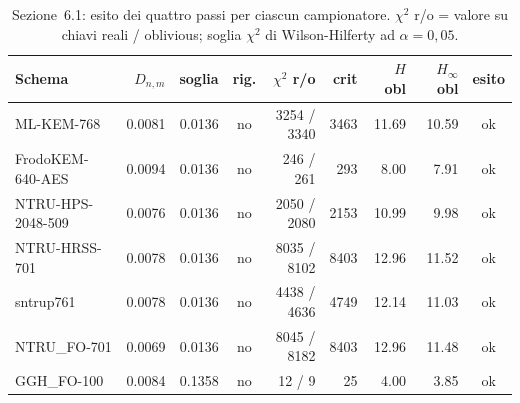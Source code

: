 \begin{table}[H]
\centering\small
\begin{tabular}{@{}lrrcrrrrc@{}}
\toprule
\textbf{Schema} & $D_{n,m}$ & soglia & rig. & $\chi^2$ r/o & crit & $H$ obl & $H_\infty$ obl & esito \\
\midrule
ML-KEM-768 & 0.0081 & 0.0136 & no & 3254 / 3340 & 3463 & 11.69 & 10.59 & ok \\
FrodoKEM-640-AES & 0.0094 & 0.0136 & no & 246 / 261 & 293 & 8.00 & 7.91 & ok \\
NTRU-HPS-2048-509 & 0.0076 & 0.0136 & no & 2050 / 2080 & 2153 & 10.99 & 9.98 & ok \\
NTRU-HRSS-701 & 0.0078 & 0.0136 & no & 8035 / 8102 & 8403 & 12.96 & 11.52 & ok \\
sntrup761 & 0.0078 & 0.0136 & no & 4438 / 4636 & 4749 & 12.14 & 11.03 & ok \\
NTRU\_FO-701 & 0.0069 & 0.0136 & no & 8045 / 8182 & 8403 & 12.96 & 11.48 & ok \\
GGH\_FO-100 & 0.0084 & 0.1358 & no & 12 / 9 & 25 & 4.00 & 3.85 & ok \\
\bottomrule
\end{tabular}
\caption{Sezione~6.1: esito dei quattro passi per ciascun campionatore. $\chi^2$ r/o = valore su chiavi reali / oblivious; soglia $\chi^2$ di Wilson-Hilferty ad $\alpha=0{,}05$.}
\label{tab:cap6-verifica-campionatori}
\end{table}
